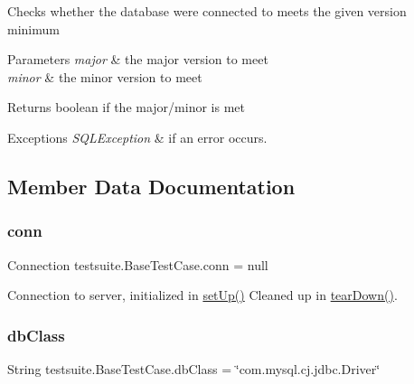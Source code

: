 Checks whether the database we\textquotesingle{}re connected to meets the given version minimum


\begin{DoxyParams}{Parameters}
{\em major} & the major version to meet \\
\hline
{\em minor} & the minor version to meet\\
\hline
\end{DoxyParams}
\begin{DoxyReturn}{Returns}
boolean if the major/minor is met
\end{DoxyReturn}

\begin{DoxyExceptions}{Exceptions}
{\em S\+Q\+L\+Exception} & if an error occurs. \\
\hline
\end{DoxyExceptions}


\subsection{Member Data Documentation}
\mbox{\label{classtestsuite_1_1_base_test_case_a51c71d14ae22c75fb285989cc78b4730}} 
\subsubsection{\texorpdfstring{conn}{conn}}
{\footnotesize\ttfamily Connection testsuite.\+Base\+Test\+Case.\+conn = null\hspace{0.3cm}{\ttfamily [protected]}}

Connection to server, initialized in \mbox{\hyperlink{classtestsuite_1_1_base_test_case_a195f5d285c7979328734606d08ad15b1}{set\+Up()}} Cleaned up in \mbox{\hyperlink{classtestsuite_1_1_base_test_case_a51c7d76ab24b0c966f956250fd7a4f52}{tear\+Down()}}. \mbox{\label{classtestsuite_1_1_base_test_case_ab78915f48e4a877fab1ace666b20f68a}} 
\subsubsection{\texorpdfstring{db\+Class}{dbClass}}
{\footnotesize\ttfamily String testsuite.\+Base\+Test\+Case.\+db\+Class = \char`\"{}com.\+mysql.\+cj.\+jdbc.\+Driver\char`\"{}\hspace{0.3cm}{\ttfamily [protected]}}

